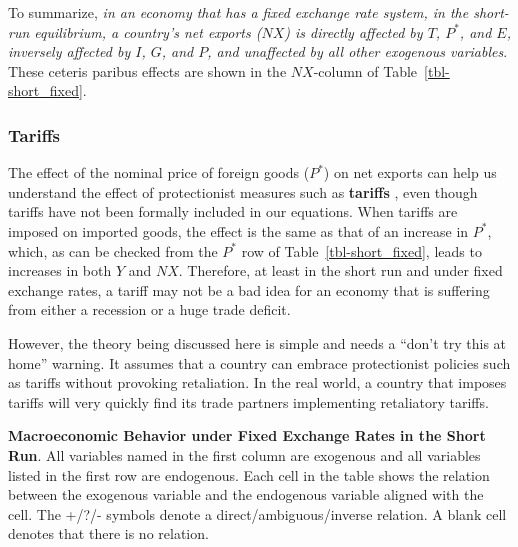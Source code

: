 \documentclass[
  letterpaper,
]{book}
\theoremstyle{plain}
\theoremstyle{remark}
\begin{document}
To summarize, \emph{in an economy that has a fixed exchange rate system,
in the short-run equilibrium, a country's net exports (\(NX\)) is
directly affected by \(T\), \(P^*\), and \(E\), inversely affected by
\(I\), \(G\), and \(P\), and unaffected by all other exogenous
variables}. These ceteris paribus effects are shown in the \(NX\)-column
of Table~\ref{tbl-short_fixed}.

\subsubsection{Tariffs}\label{sec-tariffs-shortfix}

The effect of the nominal price of foreign goods (\(P^*\)) on net
exports can help us understand the effect of protectionist measures such
as \textbf{tariffs} , even though tariffs have not been
formally included in our equations. When tariffs are imposed on imported
goods, the effect is the same as that of an increase in \(P^*\), which,
as can be checked from the \(P^*\) row of Table~\ref{tbl-short_fixed},
leads to increases in both \(Y\) and \(NX\). Therefore, at least in the
short run and under fixed exchange rates, a tariff may not be a bad idea
for an economy that is suffering from either a recession or a huge trade
deficit.

However, the theory being discussed here is simple and needs a ``don't
try this at home'' warning. It assumes that a country can embrace
protectionist policies such as tariffs without provoking retaliation. In
the real world, a country that imposes tariffs will very quickly find
its trade partners implementing retaliatory tariffs.

\begin{table}

\caption{\label{tbl-short_fixed}\textbf{Macroeconomic Behavior under
Fixed Exchange Rates in the Short Run}. All variables named in the first
column are exogenous and all variables listed in the first row are
endogenous. Each cell in the table shows the relation between the
exogenous variable and the endogenous variable aligned with the cell.
The +/?/- symbols denote a direct/ambiguous/inverse relation. A blank
cell denotes that there is no relation.}


\end{table}%
\end{document}
